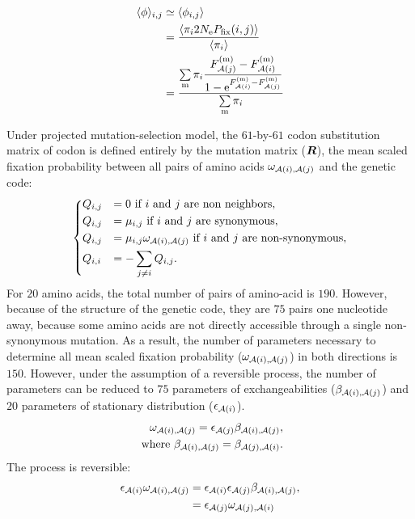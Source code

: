 \begin{align}
    \langle \phi \rangle_{{i}, {j}} & \simeq \langle \phi_{{i}, {j}} \rangle \\
    & = \dfrac{ \langle \pi_{{i}} 2N_{\textrm{e}} P_{\mathrm{fix}}({i}, {j}) \rangle }{ \langle \pi_{{i}} \rangle } \\
    & = \dfrac{ \sum\limits_{\text{m}}  \pi_{{i}}\dfrac{F_{\mathcal{A}({j})}^{(\text{m})} - F_{\mathcal{A}({i})}^{(\text{m})}}{1 - \mathrm{e}^{F_{\mathcal{A}({i})}^{(\text{m})} - F_{\mathcal{A}({j})}^{(\text{m})}}} }{ \sum\limits_{\text{m}} \pi_{{i}} }
\end{align}

Under projected mutation-selection model, the $61$-by-$61$ codon substitution matrix of codon is defined entirely by the mutation matrix ($\bm{R}$), the mean scaled fixation probability between all pairs of amino acids $\omega_{\mathcal{A}({i}), \mathcal{A}({j})}$ and the genetic code:
\begin{equation}
    \begin{dcases}
        Q_{{i}, {j}} & = 0 \text{ if ${i}$ and ${j}$ are non neighbors}, \\
        Q_{{i}, {j}} & = \mu_{{i}, {j}} \text{ if ${i}$ and ${j}$ are synonymous}, \\
        Q_{{i}, {j}} & = \mu_{{i}, {j}} \omega_{\mathcal{A}({i}), \mathcal{A}({j})} \text{ if ${i}$ and ${j}$ are non-synonymous}, \\
        Q_{{i}, {i}} & = - \sum\limits_{{j} \neq {i}} Q_{{i}, {j}}.
    \end{dcases}
    \label{eq:codon-mean-field}
\end{equation}
For $20$ amino acids, the total number of pairs of amino-acid is $190$.
However, because of the structure of the genetic code, they are $75$ pairs one nucleotide away, because some amino acids are not directly accessible through a single non-synonymous mutation.
As a result, the number of parameters necessary to determine all mean scaled fixation probability ($\omega_{\mathcal{A}({i}), \mathcal{A}({j})}$) in both directions is $150$.
However, under the assumption of a reversible process, the number of parameters can be reduced to $75$ parameters of exchangeabilities ($\beta_{\mathcal{A}({i}), \mathcal{A}({j})}$) and $20$ parameters of stationary distribution ($\epsilon_{\mathcal{A}({i})}$).
\begin{align}
    \omega_{\mathcal{A}({i}), \mathcal{A}({j})} = \epsilon_{\mathcal{A}({j})} \beta_{\mathcal{A}({i}), \mathcal{A}({j})}, \\
    \text{ where } \beta_{\mathcal{A}({i}), \mathcal{A}({j})} = \beta_{\mathcal{A}({j}), \mathcal{A}({i})}.
\end{align}
The process is reversible:
\begin{align}
    \epsilon_{\mathcal{A}({i})} \omega_{\mathcal{A}({i}), \mathcal{A}({j})} & = \epsilon_{\mathcal{A}({i})} \epsilon_{\mathcal{A}({j})} \beta_{\mathcal{A}({i}), \mathcal{A}({j})}, \\
    & = \epsilon_{\mathcal{A}({j})} \omega_{\mathcal{A}({j}), \mathcal{A}({i})}
\end{align}

